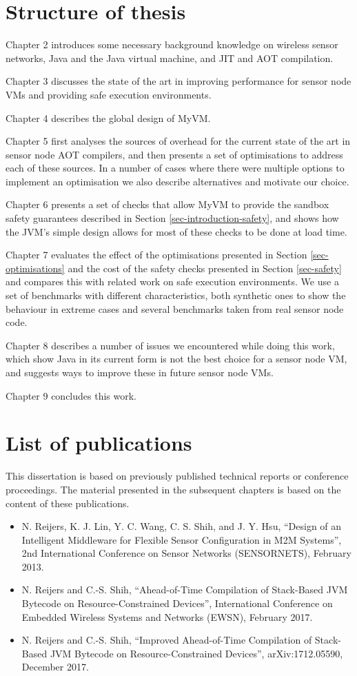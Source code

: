\section{Structure of thesis}
Chapter 2 introduces some necessary background knowledge on wireless sensor networks, Java and the Java virtual machine, and JIT and AOT compilation.

Chapter 3 discusses the state of the art in improving performance for sensor node VMs and providing safe execution environments.

Chapter 4 describes the global design of MyVM.

Chapter 5 first analyses the sources of overhead for the current state of the art in sensor node AOT compilers, and then presents a set of optimisations to address each of these sources. In a number of cases where there were multiple options to implement an optimisation we also describe alternatives and motivate our choice.

Chapter 6 presents a set of checks that allow MyVM to provide the sandbox safety guarantees described in Section \ref{sec-introduction-safety}, and shows how the JVM's simple design allows for most of these checks to be done at load time.

Chapter 7 evaluates the effect of the optimisations presented in Section \ref{sec-optimisations} and the cost of the safety checks presented in Section \ref{sec-safety} and compares this with related work on safe execution environments. We use a set of benchmarks with different characteristics, both synthetic ones to show the behaviour in extreme cases and several benchmarks taken from real sensor node code.

Chapter 8 describes a number of issues we encountered while doing this work, which show Java in its current form is not the best choice for a sensor node VM, and suggests ways to improve these in future sensor node VMs.

Chapter 9 concludes this work.

\section{List of publications}
This dissertation is based on previously published technical reports or conference proceedings. The material presented in the subsequent chapters is based on the content of these publications.

\begin{itemize}
    \item N. Reijers, K. J. Lin, Y. C. Wang, C. S. Shih, and J. Y. Hsu, “Design of an Intelligent Middleware for Flexible Sensor Configuration in M2M Systems”, 2nd International Conference on Sensor Networks (SENSORNETS), February 2013.
    \item N. Reijers and C.-S. Shih, “Ahead-of-Time Compilation of Stack-Based JVM Bytecode on Resource-Constrained Devices”, International Conference on Embedded Wireless Systems and Networks (EWSN), February 2017.
    \item N. Reijers and C.-S. Shih, “Improved Ahead-of-Time Compilation of Stack-Based JVM Bytecode on Resource-Constrained Devices”, arXiv:1712.05590, December 2017.
\end{itemize}

